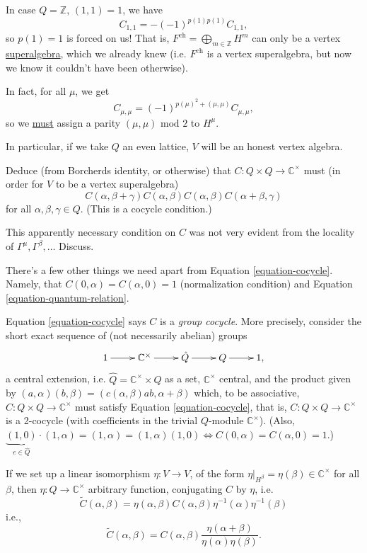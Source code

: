In case $Q=\mathbb{Z}$, $(1,1)=1$,
we have
$$
C_{1,1}=-(-1)^{p(1)p(1)}C_{1,1},
$$
so $p(1)=1$ is forced on us! That is,
$F^{\text{ch}}=\bigoplus_{m \in \mathbb{Z}}H^m$ can only be
a vertex \underline{superalgebra},
which we already knew (i.e. $F^\text{ch}$ is a vertex superalgebra,
but now we know it couldn't have been otherwise).

In fact, for all $\mu$, we get
$$
C_{\mu,\mu}=(-1)^{p(\mu)^2+(\mu,\mu)}C_{\mu,\mu},
$$
so we \underline{must} assign a parity $(\mu,\mu)\text{ mod }2$ 
to $H^\mu$.

In particular, if we take $Q$ an even lattice,
$V$ will be an honest vertex algebra.

\begin{exercise}
\label{exercise-cocycle}
Deduce (from Borcherds identity, or otherwise)
that $C:Q \times Q\to \mathbb{C}^\times$
must (in order for $V$ to be a vertex superalgebra)
\begin{equation}
\label{equation-cocycle}
C(\alpha,\beta+\gamma)C(\alpha,\beta)C(\alpha,\beta)C(\alpha+\beta,\gamma)
\end{equation}
for all $\alpha,\beta,\gamma \in Q$. (This is a cocycle condition.)

This apparently necessary condition on $C$ was not very evident
from the locality of $\Gamma^\mu,\Gamma^\beta,\ldots$ Discuss.
\end{exercise}

\noindent
There's a few other things we need apart from Equation \ref{equation-cocycle}.
Namely, that $C(0,\alpha)=C(\alpha,0)=1$
(normalization condition)
and Equation \ref{equation-quantum-relation}.

Equation \ref{equation-cocycle} says $C$ is a {\it group cocycle}.
More precisely, consider the short exact sequence of
(not necessarily abelian) groups
$$
\xymatrix{
1\ar[r]&\mathbb{C}^\times\ar[r]&\hat{Q}\ar[r]&Q\ar[r]&1,
}
$$
a central extension, i.e. $\hat{Q}=\mathbb{C}^\times \times Q$ 
as a set, $\mathbb{C}^\times$ central, and 
the product given by
$(a,\alpha)(b,\beta)=(c(\alpha,\beta)ab,\alpha+\beta)$ 
which, to be associative,
$C:Q \times Q \to \mathbb{C}^\times$ must satisfy
Equation \ref{equation-cocycle}, that is, $C:Q \times Q \to \mathbb{C}^\times$
is a 2-cocycle
(with coefficients in the trivial $Q$-module  $\mathbb{C}^\times$).
(Also, $\underbrace{(1,0)}_{e \in \hat{Q}}\cdot(1,\alpha)=(1,\alpha)=
(1,\alpha)(1,0)\iff C(0,\alpha)=C(\alpha,0)=1$.)

\begin{remark}
\label{remark-isomorphism}
If we set up a linear isomorphism
$\eta:V \to V$, of the form
$\eta|_{H^\beta}=\eta(\beta) \in \mathbb{C}^\times$ for all $\beta$,
then $\eta:Q \to \mathbb{C}^\times$ arbitrary function,
conjugating $C$ by $\eta$, i.e.
$$
\tilde{C}(\alpha,\beta)=
\eta(\alpha,\beta)C(\alpha,\beta)\eta^{-1}(\alpha)\eta^{-1}(\beta)
$$
i.e.,
$$
\tilde{C}(\alpha,\beta)=C(\alpha,\beta)
\frac{\eta(\alpha+\beta)}
{\eta(\alpha)\eta(\beta)}.
$$
\end{remark}


